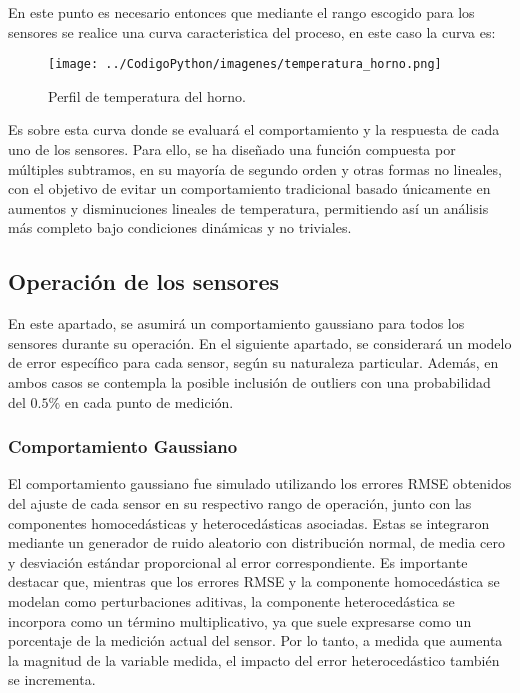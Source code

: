 \documentclass[conference]{IEEEtran}
\begin{document}
En este punto es necesario entonces que mediante el rango escogido para los sensores se realice una curva caracteristica del proceso, en este caso la curva es:


\begin{figure}[h!]
	\centering
	\texttt{[image: ../CodigoPython/imagenes/temperatura\_horno.png]}
	\caption{Perfil de temperatura del horno.}
	\label{fig:5}
\end{figure}

Es sobre esta curva donde se evaluará el comportamiento y la respuesta de cada uno de los sensores. Para ello, se ha diseñado una función compuesta por múltiples subtramos, en su mayoría de segundo orden y otras formas no lineales, con el objetivo de evitar un comportamiento tradicional basado únicamente en aumentos y disminuciones lineales de temperatura, permitiendo así un análisis más completo bajo condiciones dinámicas y no triviales.



\subsection{Operación de los sensores}

En este apartado, se asumirá un comportamiento gaussiano para todos los sensores durante su operación. En el siguiente apartado, se considerará un modelo de error específico para cada sensor, según su naturaleza particular. Además, en ambos casos se contempla la posible inclusión de outliers con una probabilidad del $0.5 \%$ en cada punto de medición.



\subsubsection{Comportamiento Gaussiano}

El comportamiento gaussiano fue simulado utilizando los errores RMSE obtenidos del ajuste de cada sensor en su respectivo rango de operación, junto con las componentes homocedásticas y heterocedásticas asociadas. Estas se integraron mediante un generador de ruido aleatorio con distribución normal, de media cero y desviación estándar proporcional al error correspondiente. Es importante destacar que, mientras que los errores RMSE y la componente homocedástica se modelan como perturbaciones aditivas, la componente heterocedástica se incorpora como un término multiplicativo, ya que suele expresarse como un porcentaje de la medición actual del sensor. Por lo tanto, a medida que aumenta la magnitud de la variable medida, el impacto del error heterocedástico también se incrementa.
\end{document}
